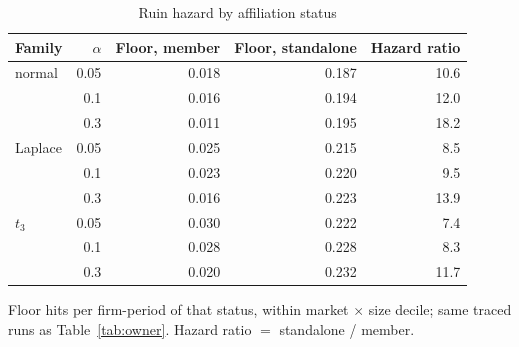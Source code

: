 \begin{table}[htbp]
\centering
\caption{Ruin hazard by affiliation status}
\label{tab:hazard}
\small
\begin{tabular}{lrrrr}
\toprule
Family & $\alpha$ & Floor, member & Floor, standalone & Hazard ratio \\
\midrule
normal & 0.05 & 0.018 & 0.187 & 10.6 \\
 & 0.1 & 0.016 & 0.194 & 12.0 \\
 & 0.3 & 0.011 & 0.195 & 18.2 \\
\midrule
Laplace & 0.05 & 0.025 & 0.215 & 8.5 \\
 & 0.1 & 0.023 & 0.220 & 9.5 \\
 & 0.3 & 0.016 & 0.223 & 13.9 \\
\midrule
$t_3$ & 0.05 & 0.030 & 0.222 & 7.4 \\
 & 0.1 & 0.028 & 0.228 & 8.3 \\
 & 0.3 & 0.020 & 0.232 & 11.7 \\
\bottomrule
\end{tabular}
\par\smallskip\begin{minipage}{0.95\linewidth}\footnotesize Floor hits per firm-period of that status, within market $\times$ size decile; same traced runs as Table~\ref{tab:owner}. Hazard ratio $=$ standalone / member.\end{minipage}
\end{table}
